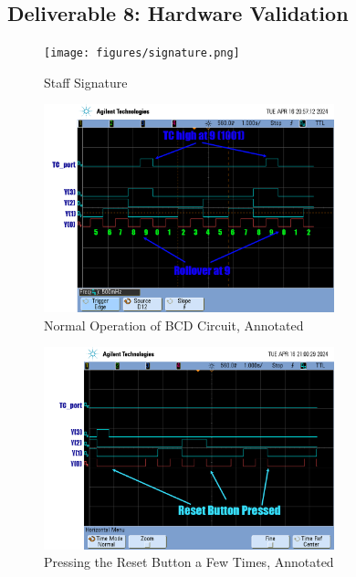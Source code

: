 \documentclass[10pt]{article}
\begin{document}
\subsection*{Deliverable 8: Hardware Validation}

\begin{figure} [H]
  \center
  \texttt{[image: figures/signature.png]}
  \caption{Staff Signature}
\end{figure}

\begin{figure} [H]
  \center
  \includegraphics[width=0.75\textwidth]{figures/normal_operation_annotated.png}
  \caption{Normal Operation of BCD Circuit, Annotated}
\end{figure}

\begin{figure} [H]
  \center
  \includegraphics[width=0.75\textwidth]{figures/reset_multiple_annotated.png}
  \caption{Pressing the Reset Button a Few Times, Annotated}
\end{figure}
\end{document}
